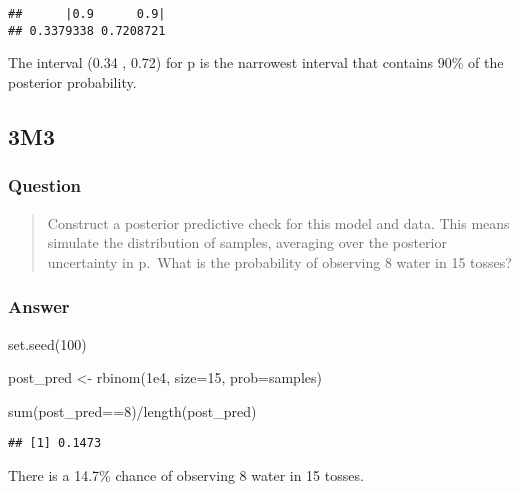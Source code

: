 \documentclass[
]{book}
\newenvironment{Shaded}{\begin{snugshade}}{\end{snugshade}}
\newcommand{\AttributeTok}[1]{\textcolor[rgb]{0.77,0.63,0.00}{#1}}
\newcommand{\DecValTok}[1]{\textcolor[rgb]{0.00,0.00,0.81}{#1}}
\newcommand{\FloatTok}[1]{\textcolor[rgb]{0.00,0.00,0.81}{#1}}
\newcommand{\FunctionTok}[1]{\textcolor[rgb]{0.00,0.00,0.00}{#1}}
\newcommand{\NormalTok}[1]{#1}
\newcommand{\OtherTok}[1]{\textcolor[rgb]{0.56,0.35,0.01}{#1}}
\newcommand{\SpecialCharTok}[1]{\textcolor[rgb]{0.00,0.00,0.00}{#1}}
\begin{document}
\begin{verbatim}
##      |0.9      0.9| 
## 0.3379338 0.7208721
\end{verbatim}

The interval (0.34 , 0.72) for p is the narrowest interval that contains 90\% of the posterior probability.

\hypertarget{m3-1}{%
\subsection*{3M3}\label{m3-1}}

\hypertarget{question-24}{%
\subsubsection*{Question}\label{question-24}}

\begin{quote}
Construct a posterior predictive check for this model and data. This means simulate the distribution of samples, averaging over the posterior uncertainty in p.~What is the probability of observing 8 water in 15 tosses?
\end{quote}

\hypertarget{answer-24}{%
\subsubsection*{Answer}\label{answer-24}}

\begin{Shaded}
\begin{Highlighting}[]
\FunctionTok{set.seed}\NormalTok{(}\DecValTok{100}\NormalTok{) }

\NormalTok{post\_pred }\OtherTok{\textless{}{-}} \FunctionTok{rbinom}\NormalTok{(}\FloatTok{1e4}\NormalTok{, }\AttributeTok{size=}\DecValTok{15}\NormalTok{, }\AttributeTok{prob=}\NormalTok{samples)}

\FunctionTok{sum}\NormalTok{(post\_pred}\SpecialCharTok{==}\DecValTok{8}\NormalTok{)}\SpecialCharTok{/}\FunctionTok{length}\NormalTok{(post\_pred)}
\end{Highlighting}
\end{Shaded}

\begin{verbatim}
## [1] 0.1473
\end{verbatim}

There is a 14.7\% chance of observing 8 water in 15 tosses.
\end{document}
